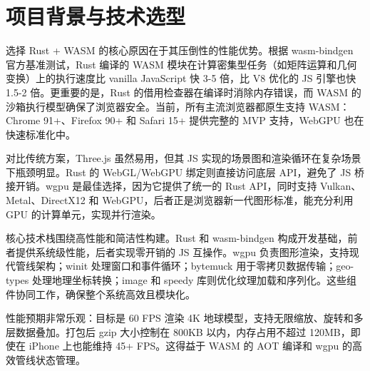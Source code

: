 \chapter{项目背景与技术选型}
选择 Rust + WASM 的核心原因在于其压倒性的性能优势。根据 wasm-bindgen 官方基准测试，Rust 编译的 WASM 模块在计算密集型任务（如矩阵运算和几何变换）上的执行速度比 vanilla JavaScript 快 3-5 倍，比 V8 优化的 JS 引擎也快 1.5-2 倍。更重要的是，Rust 的借用检查器在编译时消除内存错误，而 WASM 的沙箱执行模型确保了浏览器安全。当前，所有主流浏览器都原生支持 WASM：Chrome 91+、Firefox 90+ 和 Safari 15+ 提供完整的 MVP 支持，WebGPU 也在快速标准化中。\par
对比传统方案，Three.js 虽然易用，但其 JS 实现的场景图和渲染循环在复杂场景下瓶颈明显。Rust 的 WebGL/WebGPU 绑定则直接访问底层 API，避免了 JS 桥接开销。wgpu 是最佳选择，因为它提供了统一的 Rust API，同时支持 Vulkan、Metal、DirectX12 和 WebGPU，后者正是浏览器新一代图形标准，能充分利用 GPU 的计算单元，实现并行渲染。\par
核心技术栈围绕高性能和简洁性构建。Rust 和 wasm-bindgen 构成开发基础，前者提供系统级性能，后者实现零开销的 JS 互操作。wgpu 负责图形渲染，支持现代管线架构；winit 处理窗口和事件循环；bytemuck 用于零拷贝数据传输；geo-types 处理地理坐标转换；image 和 speedy 库则优化纹理加载和序列化。这些组件协同工作，确保整个系统高效且模块化。\par
性能预期非常乐观：目标是 60 FPS 渲染 4K 地球模型，支持无限缩放、旋转和多层数据叠加。打包后 gzip 大小控制在 800KB 以内，内存占用不超过 120MB，即使在 iPhone 上也能维持 45+ FPS。这得益于 WASM 的 AOT 编译和 wgpu 的高效管线状态管理。\par
